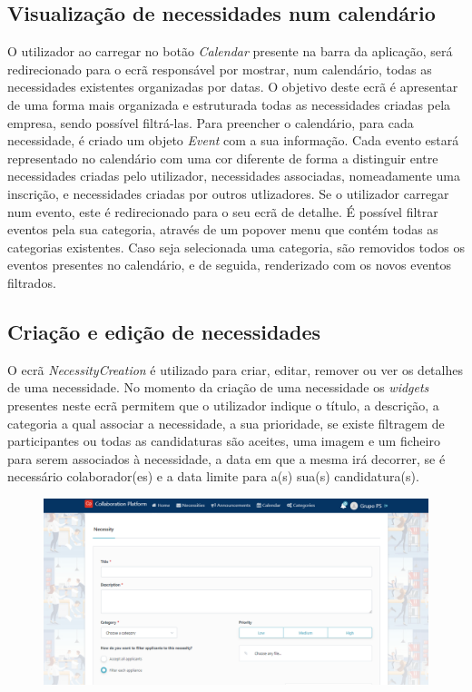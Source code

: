 \subsection{Visualização de necessidades num calendário}\label{subsec:implementacao:calendarNecessitiesView}
O utilizador ao carregar no botão \textit{Calendar} presente na barra da aplicação, será redirecionado para o ecrã responsável por mostrar, num calendário, todas as necessidades existentes organizadas por datas. 
O objetivo deste ecrã é apresentar de uma forma mais organizada e estruturada todas as necessidades criadas pela empresa, sendo possível filtrá-las. 
Para preencher o calendário, para cada necessidade, é criado um objeto \textit{Event} com a sua informação. 
Cada evento estará representado no calendário com uma cor diferente de forma a distinguir entre necessidades criadas pelo utilizador, necessidades associadas, nomeadamente uma inscrição, e necessidades criadas por outros utlizadores.
Se o utilizador carregar num evento, este é redirecionado para o seu ecrã de detalhe. 
É possível filtrar eventos pela sua categoria, através de um popover menu que contém todas as categorias existentes. 
Caso seja selecionada uma categoria, são removidos todos os eventos presentes no calendário, e de seguida, renderizado com os novos eventos filtrados.


\subsection{Criação e edição de necessidades}\label{subsec:implementacao:necessityCreation}

O ecrã \textit{NecessityCreation} é utilizado para criar, editar, remover ou ver os detalhes de uma necessidade.
No momento da criação de uma necessidade os \textit{widgets} presentes neste ecrã permitem que o utilizador indique o título, a descrição, a categoria a qual associar a necessidade, a sua prioridade, 
se existe filtragem de participantes ou todas as candidaturas são aceites, uma imagem e um ficheiro para serem associados à necessidade, a data em que a mesma irá decorrer, se é necessário colaborador(es) e a data limite para a(s) sua(s) candidatura(s).

\begin{figure}[H]
  \centering 
  \includegraphics[scale=0.4]{figures/NecessityCreation1.png}\label{fig:necessityCreation1}
\end{figure}


